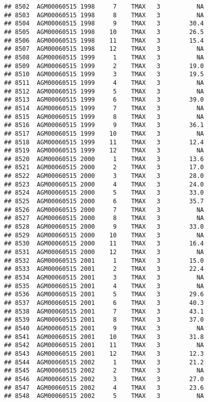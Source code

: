 \documentclass{article}\usepackage[]{graphicx}\usepackage[]{color}
\makeatletter
\newenvironment{kframe}{%
 \def\at@end@of@kframe{}%
 \ifinner\ifhmode%
  \def\at@end@of@kframe{\end{minipage}}%
  \begin{minipage}{\columnwidth}%
 \fi\fi%
 \def\FrameCommand##1{\hskip\@totalleftmargin \hskip-\fboxsep
 \colorbox{shadecolor}{##1}\hskip-\fboxsep
     \hskip-\linewidth \hskip-\@totalleftmargin \hskip\columnwidth}%
 \MakeFramed {\advance\hsize-\width
   \@totalleftmargin\z@ \linewidth\hsize
   \@setminipage}}%
 {\par\unskip\endMakeFramed%
 \at@end@of@kframe}
\newenvironment{knitrout}{}{} %
\makeatother
\begin{document}
\begin{knitrout}
\begin{kframe}
\begin{verbatim}
## 8502  AGM00060515 1998     7    TMAX   3          NA
## 8503  AGM00060515 1998     8    TMAX   3          NA
## 8504  AGM00060515 1998     9    TMAX   3        30.4
## 8505  AGM00060515 1998    10    TMAX   3        26.5
## 8506  AGM00060515 1998    11    TMAX   3        15.4
## 8507  AGM00060515 1998    12    TMAX   3          NA
## 8508  AGM00060515 1999     1    TMAX   3          NA
## 8509  AGM00060515 1999     2    TMAX   3        19.0
## 8510  AGM00060515 1999     3    TMAX   3        19.5
## 8511  AGM00060515 1999     4    TMAX   3          NA
## 8512  AGM00060515 1999     5    TMAX   3          NA
## 8513  AGM00060515 1999     6    TMAX   3        39.0
## 8514  AGM00060515 1999     7    TMAX   3          NA
## 8515  AGM00060515 1999     8    TMAX   3          NA
## 8516  AGM00060515 1999     9    TMAX   3        36.1
## 8517  AGM00060515 1999    10    TMAX   3          NA
## 8518  AGM00060515 1999    11    TMAX   3        12.4
## 8519  AGM00060515 1999    12    TMAX   3          NA
## 8520  AGM00060515 2000     1    TMAX   3        13.6
## 8521  AGM00060515 2000     2    TMAX   3        17.0
## 8522  AGM00060515 2000     3    TMAX   3        28.0
## 8523  AGM00060515 2000     4    TMAX   3        24.0
## 8524  AGM00060515 2000     5    TMAX   3        33.0
## 8525  AGM00060515 2000     6    TMAX   3        35.7
## 8526  AGM00060515 2000     7    TMAX   3          NA
## 8527  AGM00060515 2000     8    TMAX   3          NA
## 8528  AGM00060515 2000     9    TMAX   3        33.0
## 8529  AGM00060515 2000    10    TMAX   3          NA
## 8530  AGM00060515 2000    11    TMAX   3        16.4
## 8531  AGM00060515 2000    12    TMAX   3          NA
## 8532  AGM00060515 2001     1    TMAX   3        15.0
## 8533  AGM00060515 2001     2    TMAX   3        22.4
## 8534  AGM00060515 2001     3    TMAX   3          NA
## 8535  AGM00060515 2001     4    TMAX   3          NA
## 8536  AGM00060515 2001     5    TMAX   3        29.6
## 8537  AGM00060515 2001     6    TMAX   3        40.3
## 8538  AGM00060515 2001     7    TMAX   3        43.1
## 8539  AGM00060515 2001     8    TMAX   3        37.0
## 8540  AGM00060515 2001     9    TMAX   3          NA
## 8541  AGM00060515 2001    10    TMAX   3        31.8
## 8542  AGM00060515 2001    11    TMAX   3          NA
## 8543  AGM00060515 2001    12    TMAX   3        12.3
## 8544  AGM00060515 2002     1    TMAX   3        21.2
## 8545  AGM00060515 2002     2    TMAX   3          NA
## 8546  AGM00060515 2002     3    TMAX   3        27.0
## 8547  AGM00060515 2002     4    TMAX   3        23.6
## 8548  AGM00060515 2002     5    TMAX   3          NA

\end{verbatim}
\end{kframe}
\end{knitrout}
\end{document}

